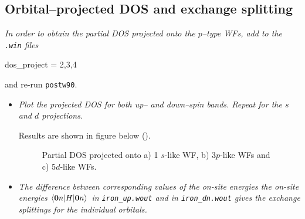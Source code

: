 \subsection*{Orbital--projected DOS and exchange splitting}
{\it In order to obtain the partial DOS projected onto the $p$--type WFs, add to the {\tt .win} files
{\tt

dos\_project = 2,3,4

}
and re-run {\tt postw90}.} 
\begin{itemize}
\item {\it Plot the projected DOS for both up-- and down--spin bands. Repeat for the $s$ and $d$ projections.}

Results are shown in figure below ().

\begin{figure}[h!]
\centering
{}
\centering
{}
\centering
{}
\caption{Partial DOS projected onto a) 1 $s$-like WF, b) 3$p$-like WFs and c) 5$d$-like WFs.}\label{fig8.7}
\end{figure}


\item {\it The difference between corresponding values of the on-site energies the on-site energies $\braket{\boldsymbol{0}n\vert H \vert \boldsymbol{0}n}$ in {\tt iron\_up.wout} and in {\tt iron\_dn.wout} gives the exchange splittings for the individual orbitals.}


\end{itemize}
